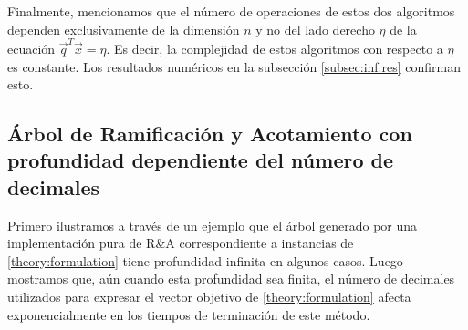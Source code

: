 Finalmente, mencionamos que el número de operaciones de estos dos algoritmos dependen exclusivamente de la
dimensión $n$ y no del lado derecho $\eta$ de la ecuación $\vec{q}^T\vec{x} = \eta$. Es decir, la
complejidad de estos algoritmos con respecto a $\eta$ es constante. Los resultados numéricos en la
subsección \ref{subsec:inf:res} confirman esto.

\subsection{Árbol de Ramificación y Acotamiento con profundidad dependiente del número de decimales}
\label{subsec:inf:int}
\noindent
Primero ilustramos a través de un ejemplo que el árbol generado por una implementación pura de R\&A
correspondiente a instancias de \eqref{theory:formulation} tiene profundidad infinita en algunos
casos. Luego mostramos que, aún cuando esta profundidad sea finita, el número de decimales
utilizados para expresar el vector objetivo de \eqref{theory:formulation} afecta exponencialmente en
los tiempos de terminación de este método.

